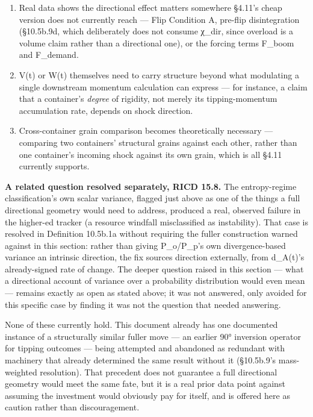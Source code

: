 \documentclass[
]{article}
\begin{document}
\begin{enumerate}
\def\labelenumi{\arabic{enumi}.}
\item
  Real data shows the directional effect matters somewhere §4.11's cheap
  version does not currently reach --- Flip Condition A, pre-flip
  disintegration (§10.5b.9d, which deliberately does not consume χ\_dir,
  since overload is a volume claim rather than a directional one), or
  the forcing terms F\_boom and F\_demand.
\item
  V(t) or W(t) themselves need to carry structure beyond what modulating
  a single downstream momentum calculation can express --- for instance,
  a claim that a container's \emph{degree} of rigidity, not merely its
  tipping-momentum accumulation rate, depends on shock direction.
\item
  Cross-container grain comparison becomes theoretically necessary ---
  comparing two containers' structural grains against each other, rather
  than one container's incoming shock against its own grain, which is
  all §4.11 currently supports.
\end{enumerate}

\textbf{A related question resolved separately, RICD 15.8.} The
entropy-regime classification's own scalar variance, flagged just above
as one of the things a full directional geometry would need to address,
produced a real, observed failure in the higher-ed tracker (a resource
windfall misclassified as instability). That case is resolved in
Definition 10.5b.1a without requiring the fuller construction warned
against in this section: rather than giving P\_o/P\_p's own
divergence-based variance an intrinsic direction, the fix sources
direction externally, from d\_A(t)'s already-signed rate of change. The
deeper question raised in this section --- what a directional account of
variance over a probability distribution would even mean --- remains
exactly as open as stated above; it was not answered, only avoided for
this specific case by finding it was not the question that needed
answering.

None of these currently hold. This document already has one documented
instance of a structurally similar fuller move --- an earlier 90°
inversion operator for tipping outcomes --- being attempted and
abandoned as redundant with machinery that already determined the same
result without it (§10.5b.9's mass-weighted resolution). That precedent
does not guarantee a full directional geometry would meet the same fate,
but it is a real prior data point against assuming the investment would
obviously pay for itself, and is offered here as caution rather than
discouragement.
\end{document}
